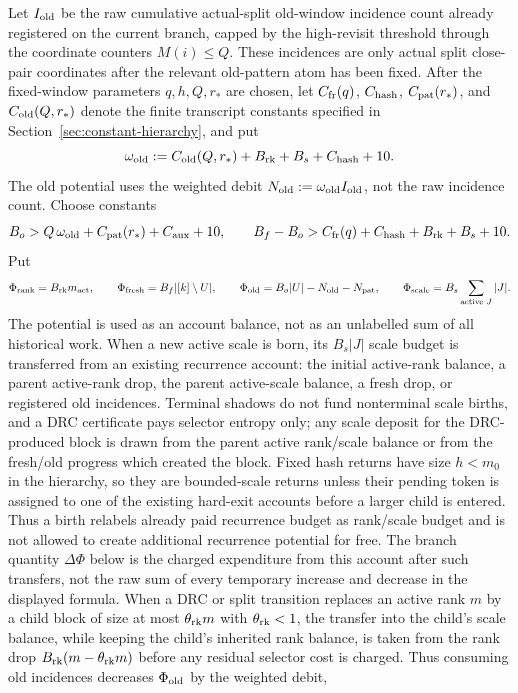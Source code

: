 \documentclass[11pt]{article}
\begin{document}
Let $I_{\rm old}$ be the raw cumulative actual-split old-window incidence count
already registered on the current branch, capped by the high-revisit threshold
through the coordinate counters $M(i)\le Q$.  These incidences are only actual split
close-pair coordinates after the relevant old-pattern atom has been fixed.
After the fixed-window parameters $q,h,Q,r_*$ are chosen, let $C_{\rm fr}(q)$,
$C_{\rm hash}$, $C_{\rm pat}(r_*)$, and $C_{\rm old}(Q,r_*)$ denote the finite
transcript constants specified in Section~\ref{sec:constant-hierarchy}, and put
\[
  \omega_{\rm old}:=C_{\rm old}(Q,r_*)+B_{\rm rk}+B_s+C_{\rm hash}+10 .
\]
The old potential uses the weighted debit
$N_{\rm old}:=\omega_{\rm old}I_{\rm old}$, not the raw incidence count.
Choose constants
\[
  B_o>Q\,\omega_{\rm old}+C_{\rm pat}(r_*)+C_{\rm aux}+10,
  \qquad
  B_f-B_o>C_{\rm fr}(q)+C_{\rm hash}+B_{\rm rk}+B_s+10.
\]
Put
\[
  \Phi_{\rm rank}=B_{\rm rk} m_{\rm act},
  \qquad
  \Phi_{\rm fresh}=B_f|[k]\setminus U|,
  \qquad
  \Phi_{\rm old}=B_o|U|-N_{\rm old}-N_{\rm pat},
  \qquad
  \Phi_{\rm scale}=B_s\sum_{\text{active }J}|J|.
\]
The potential is used as an account balance, not as an unlabelled sum of all
historical work.  When a new active scale is born, its $B_s|J|$ scale budget is
transferred from an existing recurrence account: the initial active-rank
balance, a parent active-rank drop, the parent active-scale balance, a fresh
drop, or registered old incidences.
Terminal shadows do not
fund nonterminal scale births, and a DRC certificate pays selector entropy only;
any scale deposit for the DRC-produced block is drawn from the parent active
rank/scale balance or from the fresh/old progress which created the block.  Fixed hash
returns have size $h<m_0$ in the hierarchy, so they are bounded-scale returns
unless their pending token is assigned to one of the existing hard-exit
accounts before a larger child is entered.  Thus a birth relabels already paid
recurrence budget as rank/scale budget and is not allowed to create additional
recurrence potential for free.  The branch quantity $\Delta\Phi$ below is the
charged expenditure from this account after such transfers, not the raw sum of
every temporary increase and decrease in the displayed formula.
When a DRC or split transition replaces an active rank $m$ by a child block of
size at most $\theta_{\rm rk}m$ with $\theta_{\rm rk}<1$, the transfer into the
child's scale balance, while keeping the child's inherited rank balance, is
taken from the rank drop
$B_{\rm rk}(m-\theta_{\rm rk}m)$ before any residual selector cost is charged.
Thus consuming old incidences decreases $\Phi_{\rm old}$ by the weighted debit,
\end{document}
